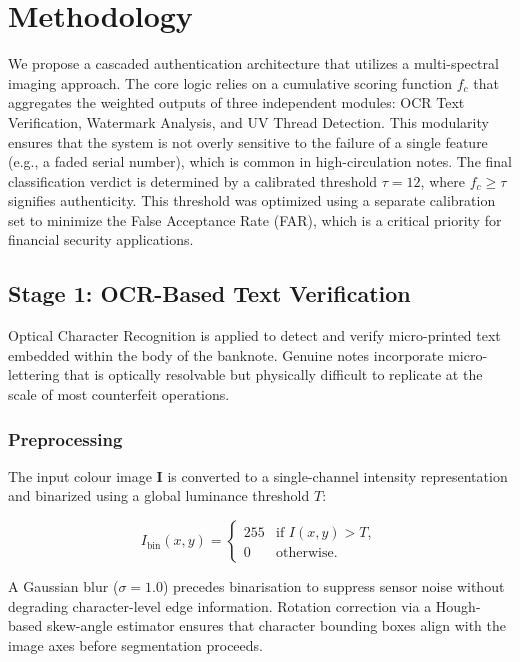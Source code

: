 \documentclass[10pt,a4paper,twocolumn,twoside]{article}
\begin{document}
\section{Methodology}
\label{sec:methodology}
We propose a cascaded authentication architecture that utilizes a multi-spectral imaging approach. The core logic relies on a cumulative scoring function $f_c$ that aggregates the weighted outputs of three independent modules: OCR Text Verification, Watermark Analysis, and UV Thread Detection. This modularity ensures that the system is not overly sensitive to the failure of a single feature (e.g., a faded serial number), which is common in high-circulation notes. The final classification verdict is determined by a calibrated threshold $\tau = 12$, where $f_c \geq \tau$ signifies authenticity. This threshold was optimized using a separate calibration set to minimize the False Acceptance Rate (FAR), which is a critical priority for financial security applications.

\subsection{Stage 1: OCR-Based Text Verification}
\label{subsec:ocr}

Optical Character Recognition is applied to detect and verify
micro-printed text embedded within the body of the banknote.
Genuine notes incorporate micro-lettering that is optically
resolvable but physically difficult to replicate at the scale of
most counterfeit operations.

\subsubsection{Preprocessing}

The input colour image $\mathbf{I}$ is converted to a
single-channel intensity representation and binarized using a
global luminance threshold $T$:

\begin{equation}
  I_{\mathrm{bin}}(x,y) =
  \begin{cases}
    255 & \text{if } I(x,y) > T, \\
    0   & \text{otherwise.}
  \end{cases}
  \label{eq:binarisation}
\end{equation}

A Gaussian blur ($\sigma = 1.0$) precedes binarisation to suppress
sensor noise without degrading character-level edge information.
Rotation correction via a Hough-based skew-angle estimator ensures
that character bounding boxes align with the image axes before
segmentation proceeds.
\end{document}
